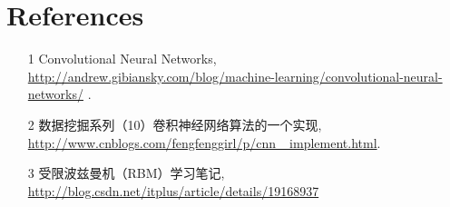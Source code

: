 \documentclass[UTF8]{ctexart}
\begin{document}
\section{References}
\begin{itemize}
\item[1] Convolutional Neural Networks, \\
\url{http://andrew.gibiansky.com/blog/machine-learning/convolutional-neural-networks/} .
\item[2] 数据挖掘系列（10）卷积神经网络算法的一个实现, \\
\url{http://www.cnblogs.com/fengfenggirl/p/cnn\_ implement.html}.
\item[3] 受限波兹曼机（RBM）学习笔记, \\
\url{http://blog.csdn.net/itplus/article/details/19168937}
\end{itemize}
\end{document}
